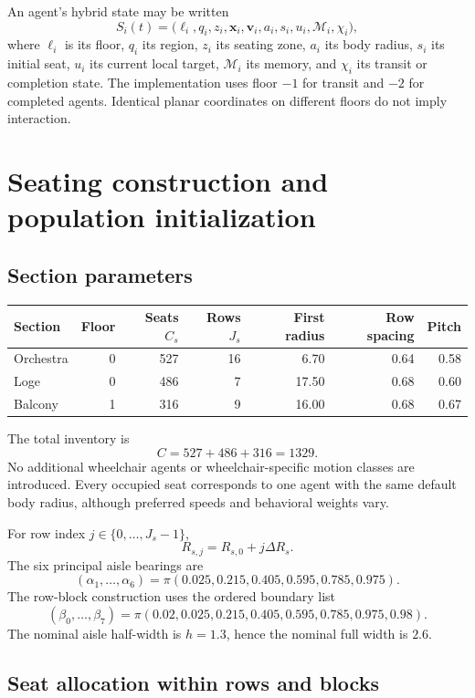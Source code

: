 \documentclass[11pt]{article}
\begin{document}
An agent's hybrid state may be written
\[
 S_i(t)=\bigl(\ell_i,q_i,z_i,\mathbf x_i,\mathbf v_i,a_i,
                  s_i,u_i,\mathcal M_i,\chi_i\bigr),
\]
where $\ell_i$ is its floor, $q_i$ its region, $z_i$ its seating zone,
$a_i$ its body radius, $s_i$ its initial seat, $u_i$ its current local target,
$\mathcal M_i$ its memory, and $\chi_i$ its transit or completion state.
The implementation uses floor $-1$ for transit and $-2$ for completed agents.
Identical planar coordinates on different floors do not imply interaction.

\section{Seating construction and population initialization}

\subsection{Section parameters}

\begin{center}
\small
\begin{tabular}{lrrrrrr}
\toprule
Section & Floor & Seats $C_s$ & Rows $J_s$ & First radius & Row spacing & Pitch\\
\midrule
Orchestra & 0 & 527 & 16 & 6.70 & 0.64 & 0.58\\
Loge      & 0 & 486 &  7 & 17.50 & 0.68 & 0.60\\
Balcony   & 1 & 316 &  9 & 16.00 & 0.68 & 0.67\\
\bottomrule
\end{tabular}
\end{center}

The total inventory is
\[
 C=527+486+316=1329.
\]
No additional wheelchair agents or wheelchair-specific motion classes are
introduced. Every occupied seat corresponds to one agent with the same
default body radius, although preferred speeds and behavioral weights vary.

For row index $j\in\{0,\ldots,J_s-1\}$,
\[
 R_{s,j}=R_{s,0}+j\Delta R_s.
\]
The six principal aisle bearings are
\[
 (\alpha_1,\ldots,\alpha_6)
 =\pi(0.025,0.215,0.405,0.595,0.785,0.975).
\]
The row-block construction uses the ordered boundary list
\[
 (\beta_0,\ldots,\beta_7)
 =\pi(0.02,0.025,0.215,0.405,0.595,0.785,0.975,0.98).
\]
The nominal aisle half-width is $h=1.3$, hence the nominal full width is $2.6$.

\subsection{Seat allocation within rows and blocks}
\end{document}
